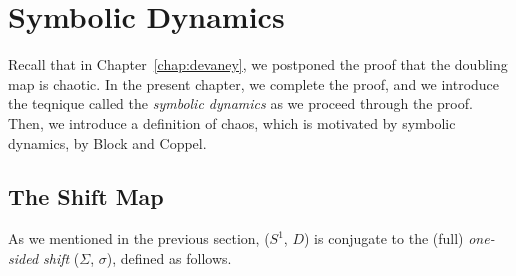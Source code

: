 \documentclass[12pt,twoside]{book}
\begin{document}
\chapter{Symbolic Dynamics}
\label{chap:symbolic}
Recall that in Chapter~\ref{chap:devaney}, we postponed the proof that the doubling map is chaotic.
In the present chapter, we complete the proof, and we introduce the teqnique called the \textit{symbolic dynamics} as we proceed through the proof.
Then, we introduce a definition of chaos, which is motivated by symbolic dynamics, by Block and Coppel.


\section{The Shift Map}
As we mentioned in the previous section, ($S^1$, $D$) is conjugate to the (full) \textit{one-sided shift} ($\Sigma$, $\sigma$), defined as follows.
\end{document}
